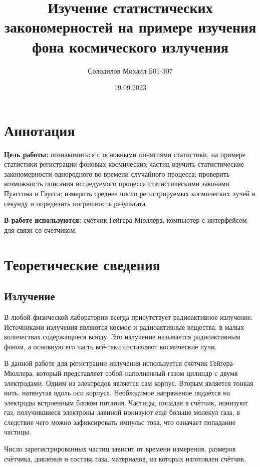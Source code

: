 \documentclass[12pt, a4paper]{article}
\title{Изучение статистических закономерностей на примере
изучения фона космического излучения}
\author{Солодилов Михаил Б01-307}
\date{19.09.2023}
\begin{document}
\maketitle
\tableofcontents

\newpage

\section{Аннотация}

\textbf{Цель работы:} познакомиться с основными понятиями статистики,
на примере статистики регистрации фоновых космических частиц изучить
статистические закономерности однородного во времени случайного
процесса; проверить возможность описания исследуемого процесса
статистическими законами Пуассона и Гаусса; измерить среднее число
регистрируемых космических лучей в секунду и определить погрешность
результата.


\textbf{В работе используются:} счётчик Гейгера-Мюллера, компьютер
с интерфейсом для связи со счётчиком.


\section{Теоретические сведения}

\subsection{Излучение}
В любой физической лаборатории всегда присутствует радиоактивное
излучение. Источниками излучения являются космос и радиоактивные
вещества, в малых количествах содержащиеся всюду. Это излучение
называется радиоактивным фоном, а основную его часть всё-таки
составляют космические лучи.


В данной работе для регистрации
излучения используется счётчик Гейгера-Мюллера, который представляет
собой наполненный газом цилиндр с двумя электродами. Одним из
электродов является сам корпус. Вторым является тонкая нить,
натянутая вдоль оси корпуса. Необходимое напряжение подаётся на
электроды встроенным блоком питания. Частицы, попадая в счётчик,
ионизуют газ, получившиеся электроны лавиной ионизуют ещё больше
молекул газа, в следствие чего можно зафиксировать импульс тока,
что означает попадание частицы. 

Число зарегистрированных частиц зависит от времени измерения,
размеров счётчика, давления и состава газа, материалов, из которых
изготовлен счётчик.

\newpage
\end{document}
